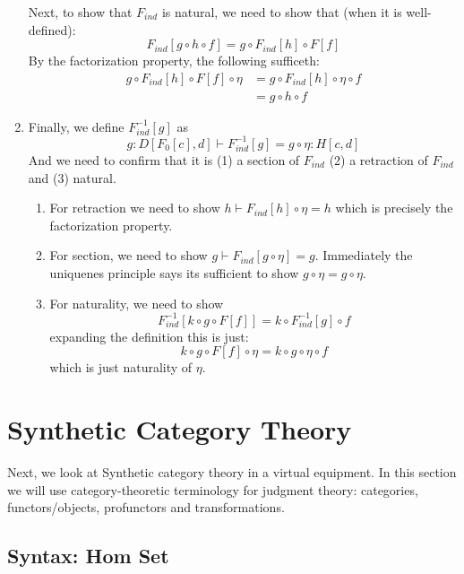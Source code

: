 \documentclass{article}
\begin{document}
\begin{construction}
\begin{enumerate}
    Next, to show that $F_{ind}$ is natural, we need to show that
    (when it is well-defined):
    \[F_{ind}[g \circ h \circ f] = g \circ F_{ind}[h] \circ F[f] \]
    By the factorization property, the following sufficeth:
    \begin{align*}
     g \circ F_{ind}[h] \circ F[f] \circ \eta
     &= g \circ F_{ind}[h] \circ \eta \circ f \tag{naturality of $\eta$}\\
     &= g \circ h \circ f \tag{factorization}
    \end{align*}
  \item Finally, we define $F_{ind}^{-1}[g]$ as
    \[ g : D[F_0[c],d] \vdash F_{ind}^{-1}[g] = g \circ \eta : H[c,d] \]
    And we need to confirm that it is (1) a section of $F_{ind}$ (2) a
    retraction of $F_{ind}$ and (3) natural.
    \begin{enumerate}
    \item For retraction we need to show $h \vdash F_{ind}[h] \circ
      \eta = h$ which is precisely the factorization property.
    \item For section, we need to show $g \vdash F_{ind}[g \circ \eta]
      = g$. Immediately the uniquenes principle says its sufficient to
      show $g \circ \eta = g \circ \eta$.
    \item For naturality, we need to show
      \[ F_{ind}^{-1}[k \circ g \circ F[f]] = k \circ F_{ind}^{-1}[g] \circ f \]
      expanding the definition this is just:
      \[ k \circ g \circ F[f] \circ \eta = k \circ g \circ \eta \circ f \]
      which is just naturality of $\eta$.
    \end{enumerate}
  \end{enumerate}
\end{construction}

\section{Synthetic Category Theory}

Next, we look at Synthetic category theory in a virtual equipment. In
this section we will use category-theoretic terminology for judgment
theory: categories, functors/objects, profunctors and transformations.

\subsection{Syntax: Hom Set}
\end{document}
